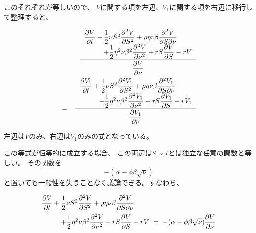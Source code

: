 \documentclass[uplatex,a4j,12pt,dvipdfmx]{jsarticle}
\begin{document}
このそれぞれが等しいので、
$V$に関する項を左辺、$V_{1}$に関する項を右辺に移行して整理すると、


\begin{eqnarray*}
	&&
	\dfrac{
		\left.
		\begin{array}{l}
			\dfrac{\partial V}{\partial t}
			+
			\dfrac{1}{2}
			\nu S^{2}
			\dfrac{\partial^{2} V}{\partial S^{2}}
			+
			\rho \eta \nu \beta
			\dfrac{\partial^{2} V}{\partial S \partial \nu}
			\\ \hspace{10mm}
			+
			\dfrac{1}{2}
			\eta^{2} \nu \beta^{2}
			\dfrac{\partial^{2} V}{\partial \nu^{2}}
			+
			rS \dfrac{\partial V}{\partial S}
			-rV
		\end{array}
		\right.
	}{
		\dfrac{\partial V}{\partial \nu}
	}
	\\ &=&
	\dfrac{
		\left.
		\begin{array}{l}
			\dfrac{\partial V_{1}}{\partial t}
			+
			\dfrac{1}{2}
			\nu S^{2}
			\dfrac{\partial^{2} V_{1}}{\partial S^{2}}
			+
			\rho \eta \nu \beta
			\dfrac{\partial^{2} V_{1}}{\partial S \partial \nu}
			\\ \hspace{10mm}
			+
			\dfrac{1}{2}
			\eta^{2} \nu \beta^{2}
			\dfrac{\partial^{2} V_{1}}{\partial \nu^{2}}
			+
			rS \dfrac{\partial V_{1}}{\partial S}
			-rV_{1}
		\end{array}
		\right.
	}{
		\dfrac{\partial V_{1}}{\partial \nu}
	}
\end{eqnarray*}


左辺は$V$のみ、右辺は$V_{1}$のみの式となっている。

この等式が恒等的に成立する場合、
この両辺は$S,\nu,t$とは独立な任意の関数と等しい。
その関数を
$$
	- (\alpha - \phi \beta \sqrt{\nu})
$$
と置いても一般性を失うことなく議論できる。すなわち、


\begin{eqnarray*}
	\begin{array}{l}
		\dfrac{\partial V}{\partial t}
		+
		\dfrac{1}{2}
		\nu S^{2}
		\dfrac{\partial^{2} V}{\partial S^{2}}
		+
		\rho \eta \nu \beta
		\dfrac{\partial^{2} V}{\partial S \partial \nu}
		\\[3mm] \hspace{10mm}
		+
		\dfrac{1}{2}
		\eta^{2} \nu \beta^{2}
		\dfrac{\partial^{2} V}{\partial \nu^{2}}
		+
		rS \dfrac{\partial V}{\partial S}
		-rV
		\ = \
		- (\alpha - \phi \beta \sqrt{\nu})
		\dfrac{\partial V}{\partial \nu}
	\end{array}
\end{eqnarray*}
\end{document}
